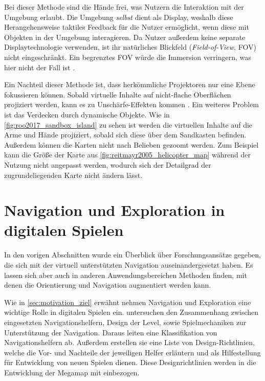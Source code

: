 Bei dieser Methode sind die Hände frei, was Nutzern die Interaktion mit der Umgebung erlaubt.
Die Umgebung \emph{selbst} dient als Display, weshalb diese Herangehensweise taktiles Feedback für die Nutzer ermöglicht, wenn diese mit Objekten in der Umgebung interagieren.
Da Nutzer außerdem keine separate Displaytechnologie verwenden, ist ihr natürliches Blickfeld (\emph{Field-of-View}, FOV) nicht eingeschränkt.
Ein begrenztes FOV würde die Immersion verringern, was hier nicht der Fall ist \parencites[3\pageff]{Krevelen2010}[10]{Bimber2006}.

Ein Nachteil dieser Methode ist, dass herkömmliche Projektoren nur eine Ebene fokussieren können.
Sobald virtuelle Inhalte auf nicht-flache Oberflächen projiziert werden, kann es zu Unschärfe-Effekten kommen \parencite[10]{Bimber2006}.
Ein weiteres Problem ist das Verdecken durch dynamische Objekte.
Wie in \autoref{fig:roo2017_sandbox_island} zu sehen ist werden die virtuellen Inhalte auf die Arme und Hände projiziert, sobald sich diese über dem Sandkasten befinden.
Außerdem können die Karten nicht nach Belieben gezoomt werden.
Zum Beispiel kann die Größe der Karte aus \autoref{fig:reitmayr2005_helicopter_map} während der Nutzung nicht angepasst werden, wodurch sich der Detailgrad der zugrundeliegenden Karte nicht ändern lässt.
\vfill

\section{Navigation und Exploration in digitalen Spielen}
In den vorigen Abschnitten wurde ein Überblick über Forschungsansätze gegeben, die sich mit der virtuell unterstützten Navigation auseinandergesetzt haben.
Es lassen sich aber auch in anderen Anwendungsbereichen Methoden finden, mit denen die Orientierung und Navigation augmentiert werden kann.

Wie in \autoref{sec:motivation_ziel} erwähnt nehmen Navigation und Exploration eine wichtige Rolle in digitalen Spielen ein.
\textcites{Moura2014}{Moura2015} untersuchen den Zusammenhang zwischen eingesetzten Navigationshelfern, Design der Level, sowie Spielmechaniken zur Unterstützung der Navigation.
Daraus leiten \textcite{Moura2015} eine Klassifikation von Navigationshelfern ab.
Außerdem erstellen sie eine Liste von Design-Richtlinien, welche die Vor- und Nachteile der jeweiligen Helfer erläutern und als Hilfestellung für Entwicklung von neuen Spielen dienen.
Diese Designrichtlinien werden in die Entwicklung der Megamap mit einbezogen.


